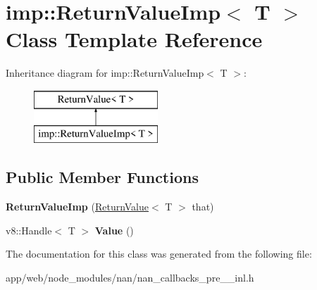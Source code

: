 \hypertarget{classimp_1_1_return_value_imp}{}\section{imp\+:\+:Return\+Value\+Imp$<$ T $>$ Class Template Reference}
\label{classimp_1_1_return_value_imp}
Inheritance diagram for imp\+:\+:Return\+Value\+Imp$<$ T $>$\+:\begin{figure}[H]
\begin{center}
\leavevmode
\includegraphics[height=2.000000cm]{classimp_1_1_return_value_imp}
\end{center}
\end{figure}
\subsection*{Public Member Functions}
\begin{DoxyCompactItemize}
\item 
\mbox{\label{classimp_1_1_return_value_imp_ad6e6a4d3eb2575418bcd24d5b51070bd}} 
{\bfseries Return\+Value\+Imp} (\hyperlink{class_return_value}{Return\+Value}$<$ T $>$ that)
\item 
\mbox{\label{classimp_1_1_return_value_imp_acc2bbb20d276204638326671133f0cc6}} 
v8\+::\+Handle$<$ T $>$ {\bfseries Value} ()
\end{DoxyCompactItemize}


The documentation for this class was generated from the following file\+:\begin{DoxyCompactItemize}
\item 
app/web/node\+\_\+modules/nan/nan\+\_\+callbacks\+\_\+pre\+\_\+\_\+inl.\+h\end{DoxyCompactItemize}
